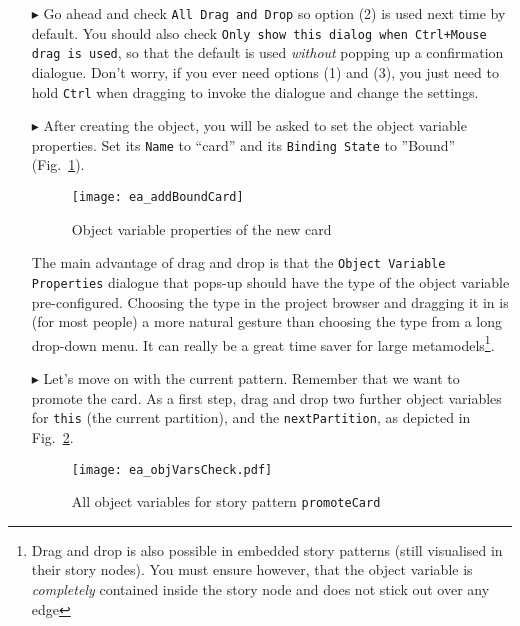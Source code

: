 \begin{itemize}
\item[$\blacktriangleright$] Go ahead and check \texttt{All Drag and Drop} so option (2) is used next time by default. You should also check \texttt{Only show
this dialog when Ctrl+Mouse drag is used}, so that the default is used \emph{without} popping up a confirmation dialogue. Don't worry, if you ever need options
(1) and (3), you  just need to hold \texttt{Ctrl} when dragging to invoke the dialogue and change the settings.

\item[$\blacktriangleright$] After creating the object, you will be asked to set the object variable properties. Set its \texttt{Name} to ``card'' and its
\texttt{Binding State} to ''Bound'' (Fig.~\ref{fig:sdm_new_card_properties}).

\begin{figure}[htbp]
\begin{center}
  \texttt{[image: ea\_addBoundCard]}
  \caption{Object variable properties of the new card}
  \label{fig:sdm_new_card_properties}
\end{center}
\end{figure}

The main advantage of drag and drop is that the \texttt{Object Variable Pro\-per\-ties} dialogue that pops-up should have the type of the object variable
pre-configured. Choosing the type in the project browser and dragging it in is (for most people) a more natural gesture than choosing the type from a long
drop-down menu. It can really be a great time saver for large metamodels\footnote{Drag and drop is also possible in embedded story patterns (still visualised in
their story nodes).  You must ensure however, that the object variable is \emph{completely} contained inside the story node and does not stick out over any
edge}.

\item[$\blacktriangleright$] Let's move on with the current pattern. Remember that we want to promote the card. As a first step, drag and drop two further
object variables for \texttt{this} (the current partition), and the \texttt{nextPartition}, as depicted in Fig.~\ref{fig:sdm_check_complete_sp}. 

\begin{figure}[htbp]
\begin{center}
  \texttt{[image: ea\_objVarsCheck.pdf]}
  \caption{All object variables for story pattern \texttt{promoteCard}}
  \label{fig:sdm_check_complete_sp}
\end{center}
\end{figure}


\end{itemize}

